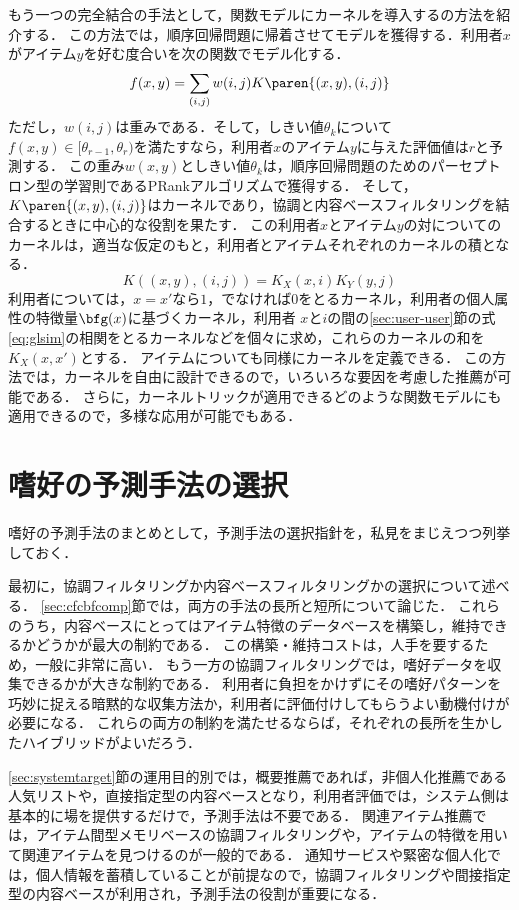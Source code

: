 もう一つの完全結合の手法として，関数モデルにカーネルを導入する\cite{icml:04:06}の方法を紹介する．
この方法では，順序回帰問題に帰着させてモデルを獲得する．利用者$x$がアイテム$y$を好む度合いを次の関数でモデル化する．
\[
f(x,y)=\sum_{(i,j)}w(i,j)K\paren{(x,y),(i,j)}
\]
ただし，$w(i,j)$は重みである．そして，しきい値$\theta_k$について$f(x,y)\in[\theta_{r-1},\theta_r)$を満たすなら，利用者$x$のアイテム$y$に与えた評価値は$r$と予測する．
この重み$w(x,y)$としきい値$\theta_k$は，順序回帰問題のためのパーセプトロン型の学習則であるPRankアルゴリズム\cite{nips:02:01}で獲得する．
そして，$K\paren{(x,y),(i,j)}$はカーネル\cite{jb:036:00}であり，協調と内容ベースフィルタリングを結合するときに中心的な役割を果たす．
この利用者$x$とアイテム$y$の対についてのカーネルは，適当な仮定のもと，利用者とアイテムそれぞれのカーネルの積となる．
\[
 K((x,y),(i,j))=K_X(x,i)K_Y(y,j)
\]
利用者については，$x=x'$なら$1$，でなければ$0$をとるカーネル，利用者の個人属性の特徴量$\bfg(x)$に基づくカーネル，利用者
$x$と$i$の間の\ref{sec:user-user}節の式\eqref{eq:glsim}の相関をとるカーネルなどを個々に求め，これらのカーネルの和を$K_X(x,x')$とする．
アイテムについても同様にカーネルを定義できる．
この方法では，カーネルを自由に設計できるので，いろいろな要因を考慮した推薦が可能である．
さらに，カーネルトリックが適用できるどのような関数モデルにも適用できるので，多様な応用が可能でもある．

\section{嗜好の予測手法の選択}
\label{sec:rsselect}

嗜好の予測手法のまとめとして，予測手法の選択指針を，私見をまじえつつ列挙しておく．

最初に，協調フィルタリングか内容ベースフィルタリングかの選択について述べる．
\ref{sec:cfcbfcomp}節では，両方の手法の長所と短所について論じた．
これらのうち，内容ベースにとってはアイテム特徴のデータベースを構築し，維持できるかどうかが最大の制約である．
この構築・維持コストは，人手を要するため，一般に非常に高い．
もう一方の協調フィルタリングでは，嗜好データを収集できるかが大きな制約である．
利用者に負担をかけずにその嗜好パターンを巧妙に捉える暗黙的な収集方法か，利用者に評価付けしてもらうよい動機付けが必要になる．
これらの両方の制約を満たせるならば，それぞれの長所を生かしたハイブリッドがよいだろう．

\ref{sec:systemtarget}節の運用目的別では，概要推薦であれば，非個人化推薦である人気リストや，直接指定型の内容ベースとなり，利用者評価では，システム側は基本的に場を提供するだけで，予測手法は不要である．
関連アイテム推薦では，アイテム間型メモリベースの協調フィルタリングや，アイテムの特徴を用いて関連アイテムを見つけるのが一般的である．
通知サービスや緊密な個人化では，個人情報を蓄積していることが前提なので，協調フィルタリングや間接指定型の内容ベースが利用され，予測手法の役割が重要になる．

